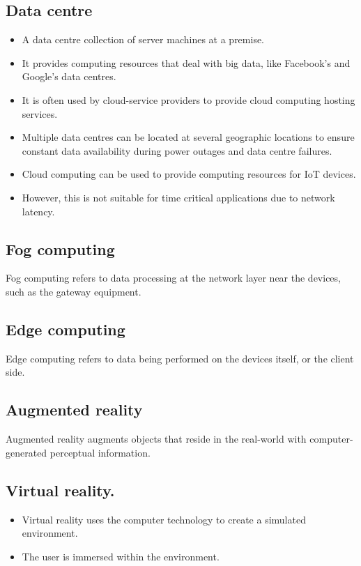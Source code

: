 \documentclass[11pt]{article}
\begin{document}
\subsection{Data centre}
\label{sec:orgd3e6515}
\begin{itemize}
\item A data centre collection of server machines at a premise.
\item It provides computing resources that deal with big data, like Facebook's and Google's data centres.
\item It is often used by cloud-service providers to provide cloud computing hosting services.
\item Multiple data centres can be located at several geographic locations to ensure constant data availability during power outages and data centre failures.
\item Cloud computing can be used to provide computing resources for IoT devices.
\item However, this is not suitable for time critical applications due to network latency.
\end{itemize}
\subsection{Fog computing}
\label{sec:orgcb1597a}
Fog computing refers to data processing at the network layer near the devices, such as the gateway equipment.
\subsection{Edge computing}
\label{sec:org02ade32}
Edge computing refers to data being performed on the devices itself, or the client side.
\subsection{Augmented reality}
\label{sec:org831c4b2}
Augmented reality augments objects that reside in the real-world with computer-generated perceptual information.
\subsection{Virtual reality.}
\label{sec:org6e53392}
\begin{itemize}
\item Virtual reality uses the computer technology to create a simulated environment.
\item The user is immersed within the environment.
\end{itemize}
\end{document}
